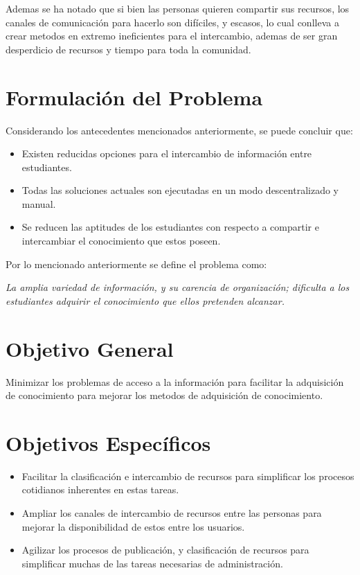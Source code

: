 \documentclass[letter,11pt,oneside,spanish]{article}
\begin{document}
Ademas se ha notado que si bien las personas quieren compartir sus recursos, los
canales de comunicación para hacerlo son difíciles, y escasos, lo cual conlleva
a crear metodos en extremo ineficientes para el intercambio, ademas de ser gran
desperdicio de recursos y tiempo para toda la comunidad.

\section{Formulación del Problema}
Considerando los antecedentes mencionados anteriormente, se puede concluir que:

\begin{itemize}
\item Existen reducidas opciones para el intercambio de información entre
estudiantes.
\item Todas las soluciones actuales son ejecutadas en un modo descentralizado y
manual.
\item Se reducen las aptitudes de los estudiantes con respecto a compartir e
intercambiar el conocimiento que estos poseen.
\end{itemize}

Por lo mencionado anteriormente se define el problema como:

\emph{La amplia variedad de información, y su carencia de organización;
dificulta a los estudiantes adquirir el conocimiento que ellos pretenden
alcanzar.}

\section{Objetivo General}
Minimizar los problemas de acceso a la información para facilitar la adquisición
de conocimiento para mejorar los metodos de adquisición de conocimiento.

\section{Objetivos Específicos}
\begin{itemize}
\item Facilitar la clasificación e intercambio de recursos para simplificar los
procesos cotidianos inherentes en estas tareas.
\item Ampliar los canales de intercambio de recursos entre las personas para
mejorar la disponibilidad de estos entre los usuarios.
\item Agilizar los procesos de publicación, y clasificación de recursos para
simplificar muchas de las tareas necesarias de administración.
\end{itemize}
\end{document}
